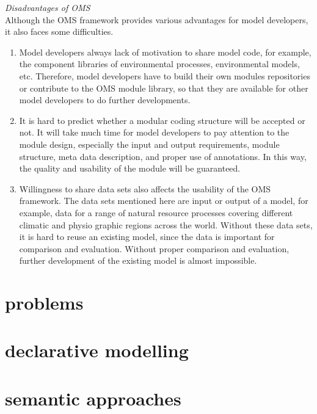 \emph{Disadvantages of OMS}\\
Although the OMS framework provides various advantages for model developers, it also faces some difficulties.
\begin{enumerate}
\item Model developers always lack of motivation to share model code, for example, the component libraries of environmental processes, environmental models, etc. Therefore, model developers have to build their own modules repositories or contribute to the OMS module library, so that they are available for other model developers to do further developments. 
\item It is hard to predict whether a modular coding structure will be accepted or not. It will take much time for model developers to pay attention to the module design, especially the input and output requirements, module structure, meta data description, and proper use of annotations. In this way, the quality and usability of the module will be guaranteed.
\item Willingness to share data sets also affects the usability of the OMS framework. The data sets mentioned here are input or output of a model, for example, data for a range of natural resource processes covering different climatic and physio graphic regions across the world. Without these data sets, it is hard to reuse an existing model, since the data is important for comparison and evaluation. Without proper comparison and evaluation, further development of the existing model is almost impossible.
\end{enumerate}


\section{problems}
\section{declarative modelling}
\section{semantic approaches}
